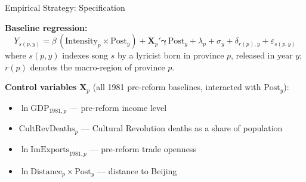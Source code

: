 \documentclass[aspectratio=169]{beamer}
\begin{document}
\begin{frame}{Empirical Strategy: Specification}

\textbf{Baseline regression:}
\begin{equation*}
  Y_{s(p,y)} = \beta\,(\text{Intensity}_p \times \text{Post}_y)
  + \mathbf{X}_p'\boldsymbol{\gamma}\,\text{Post}_y
  + \lambda_p + \sigma_y + \delta_{r(p),y} + \varepsilon_{s(p,y)}
\end{equation*}
\vspace{-0.3em}
where $s(p,y)$ indexes song $s$ by a lyricist born in province $p$, released in year $y$; $r(p)$ denotes the macro-region of province $p$.

\vspace{0.8em}
\textbf{Control variables} $\mathbf{X}_p$ (all 1981 pre-reform baselines, interacted with $\text{Post}_y$):
\begin{itemize}\small
  \item $\ln\text{GDP}_{1981,p}$ — pre-reform income level
  \item $\text{CultRevDeaths}_p$ — Cultural Revolution deaths as a share of population
  \item $\ln\text{ImExports}_{1981,p}$ — pre-reform trade openness
  \item $\ln\text{Distance}_p \times \text{Post}_y$ — distance to Beijing
\end{itemize}
\end{frame}
\end{document}
